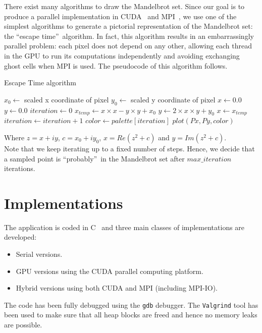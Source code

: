 \documentclass[11pt,a4paper]{article}
\begin{document}
There exist many algorithms to draw the Mandelbrot set. 
Since our goal is to produce a parallel implementation in CUDA~\cite{cuda} and MPI~\cite{mpi}, we use one of the simplest algorithms to generate a pictorial representation of the Mandelbrot set: the \textquotedblleft escape time\textquotedblright~algorithm.
In fact, this algorithm results in an embarrassingly parallel problem: each pixel does not depend on any other, allowing each thread in the GPU to run its computations independently and avoiding exchanging ghost cells when MPI is used.
The pseudocode of this algorithm follows.\\
\setlength{\textfloatsep}{6pt} %
\begin{algorithm}
	\caption{Escape Time algorithm}\label{euclid}
	\begin{algorithmic}[1]
		\State $x_0 \gets$ scaled x coordinate of pixel
		\State $y_0 \gets$ scaled y coordinate of pixel
		\State $x \gets 0.0$
		\State $y \gets 0.0$
		\State $iteration \gets 0$
			\State $x_{temp} \gets x\times x - y\times y + x_0$
			\State $y \gets 2\times x\times y + y_0$
			\State $x \gets x_{temp}$
			\State $iteration \gets iteration + 1$
		\EndWhile
		\State $color \gets palette[iteration]$
		\State $plot(Px, Py, color)$
		\EndFor
	\end{algorithmic}
\end{algorithm}
\noindent
Where $z = x + iy$, $c = x_0 + iy_0$, $x = Re(z^2+c)$ and $y=Im(z^2+c)$.\\
Note that we keep iterating up to a fixed number of steps.
Hence, we decide that a sampled point is \textquotedblleft probably\textquotedblright~in the Mandelbrot set after $max\_iteration$ iterations.

\vspace{-0.3cm}
\section{Implementations}

The application is coded in C~\cite{ritchie} and three main classes of implementations are developed:
\begin{itemize}
\vspace{-0.2cm}
\itemsep0em 
	
\item Serial versions.
\item GPU versions using the CUDA parallel computing platform.
\item Hybrid versions using both CUDA and MPI (including MPI-IO).
\end{itemize}
\vspace{-0.1cm}
The code has been fully debugged using the \texttt{gdb} debugger. 
The \texttt{Valgrind} tool has been used to make sure that all heap blocks are freed and hence no memory leaks are possible. 
\end{document}
